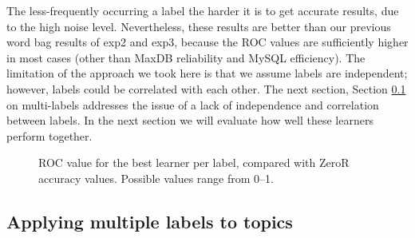\documentclass[]{sig-alternate}
\begin{document}
The less-frequently occurring a label the harder it is to get accurate
results, due to the high noise level. Nevertheless, these results are
better than our previous word bag results of \textsf{exp2} and
\textsf{exp3}, because the ROC values are sufficiently higher in most
cases (other than MaxDB reliability and MySQL efficiency). The
limitation of the approach we took here is that we assume labels are
independent; however, labels could be correlated with each other. 
The next section, Section \ref{sec:multilabel} on multi-labels
addresses the issue of a lack of independence and correlation between labels.
In the next section we will evaluate how well these learners perform
together.

\begin{figure}[ht]
\centering
{}
\label{fig:best-learn-per-tag}
\caption[]{ROC value for the best learner per label, compared with ZeroR accuracy values.  Possible values range from 0--1.
}
\end{figure}

\subsection{Applying multiple labels to topics}
\label{sec:multilabel}
\end{document}
